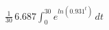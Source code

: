 \documentclass[preview]{standalone}
\begin{document}
\begin{align*}
\frac{1}{30}\,6.687\int_0^{30}e^{ln(0.931^t)}\,dt
\end{align*}
\end{document}
